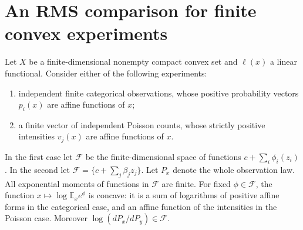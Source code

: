 \documentclass[11pt]{article}
\newcommand{\E}{\mathbb E}
\begin{document}
\section{An RMS comparison for finite convex experiments}
Let $X$ be a finite-dimensional nonempty compact convex set and $\ell(x)$
a linear functional. Consider either of the following experiments:
\begin{enumerate}
\item independent finite categorical observations, whose positive probability
vectors $p_i(x)$ are affine functions of $x$;
\item a finite vector of independent Poisson counts, whose strictly positive
intensities $v_j(x)$ are affine functions of $x$.
\end{enumerate}
In the first case let $\mathcal F$ be the finite-dimensional space of
functions $c+\sum_i\phi_i(z_i)$. In the second let
$\mathcal F=\{c+\sum_j\beta_j z_j\}$. Let $P_x$ denote the whole
observation law. All exponential moments of functions in $\mathcal F$
are finite. For fixed $\phi\in\mathcal F$, the function
$x\mapsto\log\E_xe^\phi$ is concave: it is a sum of logarithms of positive
affine forms in the categorical case, and an affine function of the
intensities in the Poisson case. Moreover $\log(dP_x/dP_y)\in\mathcal F$.
\end{document}
